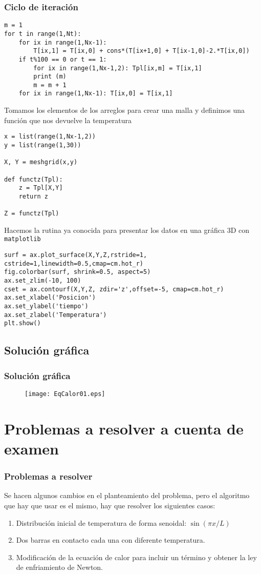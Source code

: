 \begin{frame}[fragile]
\frametitle{Ciclo de iteración}
\begin{lstlisting}
m = 1
for t in range(1,Nt):
    for ix in range(1,Nx-1):
        T[ix,1] = T[ix,0] + cons*(T[ix+1,0] + T[ix-1,0]-2.*T[ix,0])
    if t%100 == 0 or t == 1:
        for ix in range(1,Nx-1,2): Tpl[ix,m] = T[ix,1]
        print (m)
        m = m + 1
    for ix in range(1,Nx-1): T[ix,0] = T[ix,1]
\end{lstlisting}
\end{frame}
\begin{frame}[fragile]
Tomamos los elementos de los arreglos para crear una malla y definimos una función que nos devuelve la temperatura
\begin{lstlisting}
x = list(range(1,Nx-1,2))
y = list(range(1,30))

X, Y = meshgrid(x,y)

def functz(Tpl):
    z = Tpl[X,Y]
    return z
    
Z = functz(Tpl)
\end{lstlisting}
\end{frame}
\begin{frame}[fragile]
Hacemos la rutina ya conocida para presentar los datos en una gráfica 3D con \texttt{matplotlib}
\begin{lstlisting}
surf = ax.plot_surface(X,Y,Z,rstride=1, cstride=1,linewidth=0.5,cmap=cm.hot_r)
fig.colorbar(surf, shrink=0.5, aspect=5)
ax.set_zlim(-10, 100)
cset = ax.contourf(X,Y,Z, zdir='z',offset=-5, cmap=cm.hot_r)
ax.set_xlabel('Posicion')
ax.set_ylabel('tiempo')
ax.set_zlabel('Temperatura')
plt.show()
\end{lstlisting}
\end{frame}
\subsection{Solución gráfica}
\begin{frame}
\frametitle{Solución gráfica}
\begin{figure}
	\centering
	\texttt{[image: EqCalor01.eps]}  
\end{figure}
\end{frame}
\section{Problemas a resolver a cuenta de examen}
\begin{frame}
\frametitle{Problemas a resolver}
Se hacen algunos cambios en el planteamiento del problema, pero el algoritmo que hay que usar es el mismo, hay que resolver los siguientes casos:
\begin{enumerate}
\item Distribución inicial de temperatura de forma senoidal: $\sin( \pi x / L)$
\item Dos barras en contacto cada una con diferente temperatura.
\item Modificación de la ecuación de calor para incluir un término y obtener la ley de enfriamiento de Newton.
\end{enumerate}
\end{frame}

